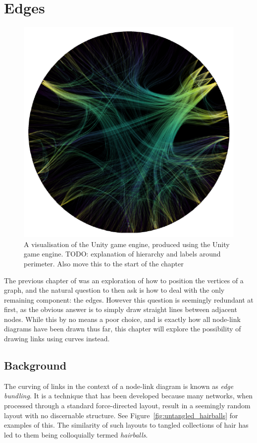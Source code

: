 \chapter{Edges}
\label{sec:edges_background}
\begin{figure}
    \centering
    \includegraphics[width=\textwidth]{power/metaunityplaceholder.png}
    \caption[The Unity game engine, visualised using the Unity game engine]{A visualisation of the Unity game engine, produced using the Unity game engine. TODO: explanation of hierarchy and labels around perimeter. Also move this to the start of the chapter}
    \label{fig:metaunity}
\end{figure}
The previous chapter of was an exploration of how to position the vertices of a graph, and the natural question to then ask is how to deal with the only remaining component: the edges. However this question is seemingly redundant at first, as the obvious answer is to simply draw straight lines between adjacent nodes. While this by no means a poor choice, and is exactly how all node-link diagrams have been drawn thus far, this chapter will explore the possibility of drawing links using curves instead.

\section{Background}
The curving of links in the context of a node-link diagram is known as \textit{edge bundling}. It is a technique that has been developed because many networks, when processed through a standard force-directed layout, result in a seemingly random layout with no discernable structure. See Figure~\ref{fig:untangled_hairballs} for examples of this. The similarity of such layouts to tangled collections of hair has led to them being colloquially termed \textit{hairballs}.

